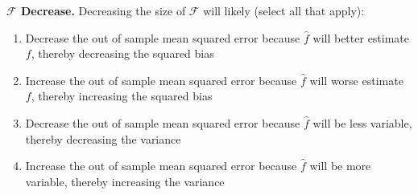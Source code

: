 \item {}
\textbf{$\mathcal{F}$ Decrease.}
Decreasing the size of $\mathcal{F}$ will likely  (select all that apply):

\begin{enumerate}[label=(\alph*)]
    \item Decrease the out of sample mean squared error because $\hat{f}$ will better estimate $f$, thereby decreasing the squared bias
    \item Increase the out of sample mean squared error because $\hat{f}$ will worse estimate $f$, thereby increasing the squared bias
    \item Decrease the out of sample mean squared error because $\hat{f}$ will be less variable, thereby decreasing the variance
    \item Increase the out of sample mean squared error because $\hat{f}$ will be more variable, thereby increasing the variance
\end{enumerate} 

